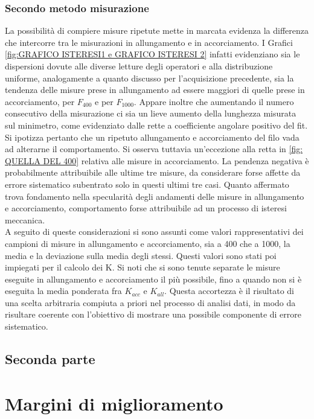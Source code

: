 \documentclass[a4paper,11pt,oneside]{article}
\begin{document}
\subsubsection*{Secondo metodo misurazione}
La possibilità di compiere misure ripetute mette in marcata evidenza la differenza che intercorre tra le misurazioni in allungamento e in accorciamento. I Grafici \ref{fig:GRAFICO ISTERESI1 e GRAFICO ISTERESI 2} infatti evidenziano sia le dispersioni dovute alle diverse letture degli operatori e alla distribuzione uniforme, analogamente a quanto discusso per l'acquisizione precedente, sia la tendenza delle misure prese in allungamento ad essere maggiori di quelle prese in accorciamento, per $F_{400}$ e per $F_{1000}$.
Appare inoltre che aumentando il numero consecutivo della misurazione ci sia un lieve aumento della lunghezza misurata sul minimetro, come evidenziato dalle rette a coefficiente angolare positivo del fit. Si ipotizza pertanto che un ripetuto allungamento e accorciamento del filo vada ad alterarne il comportamento. 
Si osserva tuttavia un'eccezione alla retta in \ref{fig: QUELLA DEL 400} relativa alle misure in accorciamento. La pendenza negativa è probabilmente attribuibile alle ultime tre misure, da considerare forse affette da errore sistematico subentrato solo in questi ultimi tre casi. Quanto affermato trova fondamento nella specularità degli andamenti delle misure in allungamento e accorciamento, comportamento forse attribuibile ad un processo di isteresi meccanica.\\
A seguito di queste considerazioni si sono assunti come valori rappresentativi dei campioni di misure in allungamento e accorciamento, sia a 400 che a 1000, la media e la deviazione sulla media degli stessi.
Questi valori sono stati poi impiegati per il calcolo dei K. Si noti che si sono tenute separate le misure eseguite in allungamento e accorciamento il più possibile, fino a quando non si è eseguita la media ponderata  fra $K_{acc}$ e $K_{all}$. Questa accortezza è il risultato di una scelta arbitraria compiuta a priori nel processo di analisi dati, in modo da risultare coerente con l'obiettivo di mostrare una possibile componente di errore sistematico.%


\subsection{Seconda parte}

\section{Margini di miglioramento}
\end{document}
